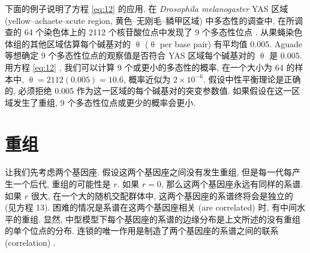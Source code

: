 \documentclass[12pt]{article}
\begin{document}
下面的例子说明了方程 \ref{eq:12} 的应用. 在 \textit{Drosophila melanogaster} YAS 区域
(yellow--achaete--scute region, 黄色--无刚毛--鳞甲区域) 中多态性的调查中,
在所调查的 64 个染色体上的 2112 个核苷酸位点中发现了 9 个多态性位点 \parencite{aguade1989}.
从果蝇染色体组的其他区域估算每个碱基对的 $\uptheta$ ($\uptheta$ per base
pair) 有平均值 0.005. Aguade 等想确定 9 个多态性位点的观察值是否符合 YAS 区域每个碱基对的 $\uptheta$
是 0.005. 用方程 \ref{eq:12} , 我们可以计算 9 个或更小的多态性的概率, 在一个大小为 64 的样本中, $\uptheta =
2112(0.005) = 10.6$, 概率近似为 $2 \times 10^{-6}$. 假设中性平衡理论是正确的, 必须拒绝 0.005
作为这一区域的每个碱基对的突变参数值. 如果假设在这一区域发生了重组, 9 个多态性位点或更少的概率会更小.

\section{重组}

让我们先考虑两个基因座. 假设这两个基因座之间没有发生重组, 但是每一代每产生一个后代, 重组的可能性是 $r$. 如果 $r=0$,
那么这两个基因座永远有同样的系谱. 如果 $r$ 很大, 在一个大的随机交配群体中, 这两个基因座的系谱终将会是独立的 (见方程 13).
困难的情况是系谱在这两个基因座相关 (are correlated) 时, 有中间水平的重组. 显然,
中型模型下每个基因座的系谱的边缘分布是上文所述的没有重组的单个位点的分布. 连锁的唯一作用是制造了两个基因座的系谱之间的联系
(correlation) .
\end{document}
